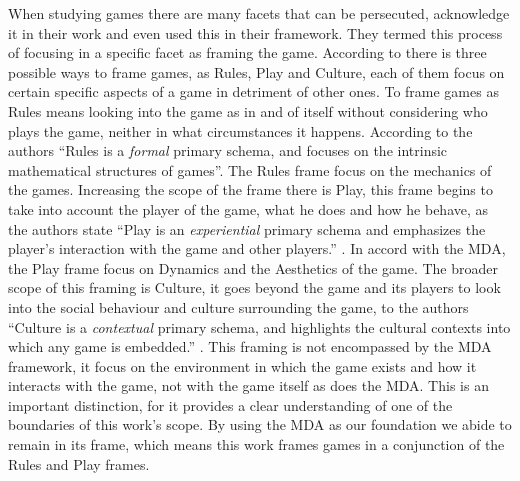 When studying games there are many facets that can be persecuted, \cite{salen2004rules} acknowledge it in their work and even used this in their framework. They termed this process of focusing in a specific facet as framing the game. According to \cite{salen2004rules} there is three possible ways to frame games, as Rules, Play and Culture, each of them focus on certain specific aspects of a game in detriment of other ones. To frame games as Rules means looking into the game as in and of itself without considering who plays the game, neither in what circumstances it happens. According to the authors ``Rules is a \textit{formal} primary schema, and focuses on the intrinsic mathematical structures of games''\citep{salen2004rules}. The Rules frame focus on the mechanics of the games. Increasing the scope of the frame there is Play, this frame begins to take into account the player of the game, what he does and how he behave, as the authors state ``Play is an \textit{experiential} primary schema and emphasizes the player's interaction with the game and other players.'' \cite{salen2004rules}. In accord with the MDA, the Play frame focus on Dynamics and the Aesthetics of the game. The broader scope of this framing is Culture, it goes beyond the game and its players to look into the social behaviour and culture surrounding the game, to the authors ``Culture is a \textit{contextual} primary schema, and highlights the cultural contexts into which any game is embedded.'' \cite{salen2004rules}. This framing is not encompassed by the MDA framework, it focus on the environment in which the game exists and how it interacts with the game, not with the game itself as does the MDA. This is an important distinction, for it provides a clear understanding of one of the boundaries of this work's scope. By using the MDA as our foundation we abide to remain in its frame, which means this work frames games in a conjunction of the Rules and Play frames.

